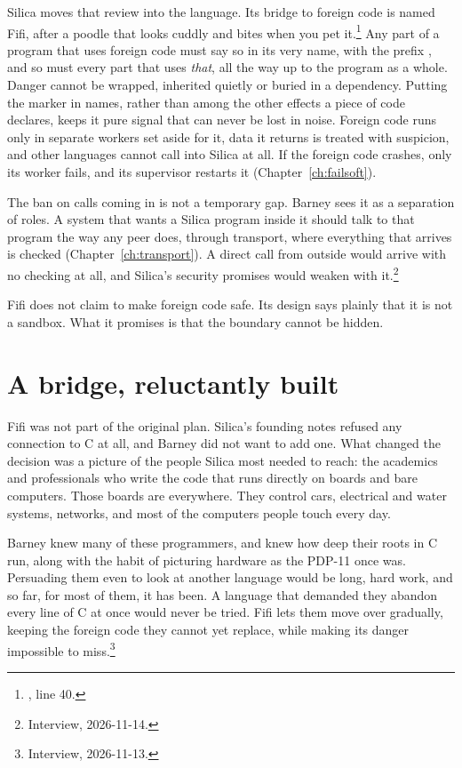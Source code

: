 Silica moves that review into the language. Its bridge to foreign code is
named Fifi, after a poodle that looks cuddly and bites when you pet
it.\footnote{, line 40.} Any part of a program that
uses foreign code must say so in its very name, with the prefix
, and so must every part that uses \emph{that}, all the way up to
the program as a whole. Danger cannot be wrapped, inherited quietly or buried in
a dependency. Putting the marker in names, rather than among the other effects a
piece of code declares, keeps it pure signal that can never be lost in noise. Foreign code runs only in
separate workers set aside for it, data it returns is treated with suspicion,
and other languages cannot call into Silica at all. If the foreign code crashes,
only its worker fails, and its supervisor restarts it
(Chapter~\ref{ch:failsoft}).

The ban on calls coming in is not a temporary gap. Barney sees it as a
separation of roles. A system that wants a Silica program inside it should talk
to that program the way any peer does, through transport, where everything that
arrives is checked (Chapter~\ref{ch:transport}). A direct call from outside
would arrive with no checking at all, and Silica's security promises would
weaken with it.\footnote{Interview, 2026-11-14.}

Fifi does not claim to make foreign code safe. Its design says plainly that it
is not a sandbox. What it promises is that the boundary cannot be hidden.

\section{A bridge, reluctantly built}

Fifi was not part of the original plan. Silica's founding notes refused any
connection to C at all, and Barney did not want to add one. What changed the
decision was a picture of the people Silica most needed to reach: the academics
and professionals who write the code that runs directly on boards and bare
computers. Those boards are everywhere. They control cars, electrical and water
systems, networks, and most of the computers people touch every day.

Barney knew many of these programmers, and knew how deep their roots in C run,
along with the habit of picturing hardware as the PDP-11 once was. Persuading
them even to look at another language would be long, hard work, and so far, for
most of them, it has been. A language that demanded they abandon every line of C
at once would never be tried. Fifi lets them move over gradually, keeping the
foreign code they cannot yet replace, while making its danger impossible to
miss.\footnote{Interview, 2026-11-13.}

